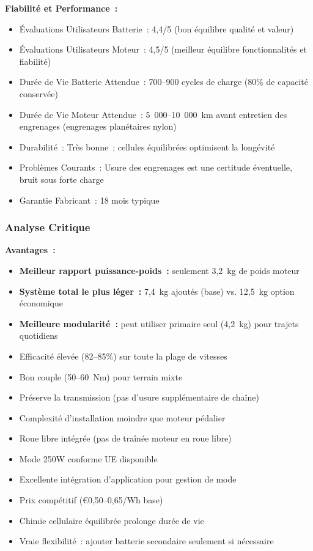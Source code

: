 \documentclass[12pt,a4paper]{article}
\begin{document}
\textbf{Fiabilité et Performance~:}
\begin{itemize}
    \item Évaluations Utilisateurs Batterie~: 4,4/5 (bon équilibre qualité et valeur) \cite{aliexpress-batteries, amazon-components}
    \item Évaluations Utilisateurs Moteur~: 4,5/5 (meilleur équilibre fonctionnalités et fiabilité) \cite{endless-sphere, ebike-review}
    \item Durée de Vie Batterie Attendue~: 700--900 cycles de charge (80\% de capacité conservée)
    \item Durée de Vie Moteur Attendue~: 5~000--10~000~km avant entretien des engrenages (engrenages planétaires nylon)
    \item Durabilité~: Très bonne~; cellules équilibrées optimisent la longévité
    \item Problèmes Courants~: Usure des engrenages est une certitude éventuelle, bruit sous forte charge
    \item Garantie Fabricant~: 18 mois typique
\end{itemize}

\subsubsection{Analyse Critique}

\textbf{Avantages~:}
\begin{itemize}
    \item \textbf{Meilleur rapport puissance-poids~:} seulement 3,2~kg de poids moteur
    \item \textbf{Système total le plus léger~:} 7,4~kg ajoutés (base) vs. 12,5~kg option économique
    \item \textbf{Meilleure modularité~:} peut utiliser primaire seul (4,2~kg) pour trajets quotidiens
    \item Efficacité élevée (82--85\%) sur toute la plage de vitesses
    \item Bon couple (50--60~Nm) pour terrain mixte
    \item Préserve la transmission (pas d'usure supplémentaire de chaîne)
    \item Complexité d'installation moindre que moteur pédalier
    \item Roue libre intégrée (pas de traînée moteur en roue libre)
    \item Mode 250W conforme UE disponible
    \item Excellente intégration d'application pour gestion de mode
    \item Prix compétitif (€0,50--0,65/Wh base)
    \item Chimie cellulaire équilibrée prolonge durée de vie
    \item Vraie flexibilité~: ajouter batterie secondaire seulement si nécessaire
\end{itemize}
\end{document}
